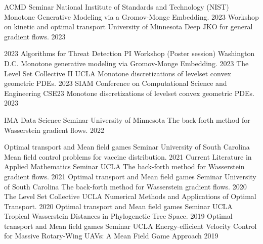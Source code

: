 \begin{cvtalks}
\cvtalk
    {ACMD Seminar} %
    {National Institute of Standards and Technology (NIST)}
    {Monotone Generative Modeling via a Gromov-Monge Embedding.} %
    {2023} %
\cvtalk
    {Workshop on kinetic and optimal transport} %
    {University of Minnesota}
    {Deep JKO for general gradient flows.} %
    {2023} %
  
  \cvtalk
    {2023 Algorithms for Threat Detection PI Workshop (Poster session)} %
    {Washington D.C.}
    {Monotone generative modeling via Gromov-Monge Embedding.} %
    {2023} %
  \cvtalk
    {The Level Set Collective II} %
    {UCLA}
    {Monotone discretizations of levelset convex geometric PDEs.} %
    {2023} %
  \cvtalk
    {SIAM Conference on Computational Science and Engineering } %
    {CSE23}
    {Monotone discretizations of levelset convex geometric PDEs.} %
    {2023} %

  \cvtalk
    {IMA Data Science Seminar} %
    {University of Minnesota}
    {The back-forth method for Wasserstein gradient flows.} %
    {2022} %

  \cvtalk
    {Optimal transport and Mean field games Seminar} %
    {University of South Carolina}
    {Mean field control problems for vaccine distribution.} %
    {2021} %
  \cvtalk
    {Current Literature in Applied Mathematics Seminar} %
    {UCLA}
    {The back-forth method for Wasserstein gradient flows.} %
    {2021} %
  \cvtalk
    {Optimal transport and Mean field games Seminar} %
    {University of South Carolina}
    {The back-forth method for Wasserstein gradient flows.} %
    {2020} %
  \cvtalk
    {The Level Set Collective} %
    {UCLA}
    {Numerical Methods and Applications of Optimal Transport.} %
    {2020} %
  \cvtalk
    {Optimal transport and Mean field games Seminar} %
    {UCLA}
    {Tropical Wasserstein Distances in Phylogenetic Tree Space.} %
    {2019} %
    \cvtalk
    {Optimal transport and Mean field games Seminar} %
    {UCLA}
    {Energy-efficient Velocity Control for Massive Rotary-Wing UAVs: A Mean Field Game Approach} %
    {2019} %
\end{cvtalks}

